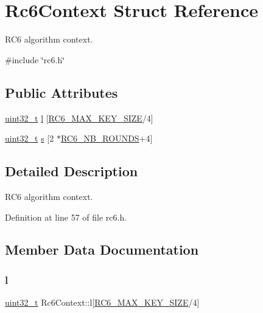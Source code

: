 \hypertarget{structRc6Context}{}\section{Rc6\+Context Struct Reference}
\label{structRc6Context}


R\+C6 algorithm context.  




{\ttfamily \#include \char`\"{}rc6.\+h\char`\"{}}

\subsection*{Public Attributes}
\begin{DoxyCompactItemize}
\item 
\hyperlink{stdint_8h_a435d1572bf3f880d55459d9805097f62}{uint32\+\_\+t} \hyperlink{structRc6Context_a57e222dc7a0b7dfe4c0df8f128199545}{l} \mbox{[}\hyperlink{rc6_8h_ae6868b69ce9bb58bb05dfc9f03567402}{R\+C6\+\_\+\+M\+A\+X\+\_\+\+K\+E\+Y\+\_\+\+S\+I\+ZE}/4\mbox{]}
\item 
\hyperlink{stdint_8h_a435d1572bf3f880d55459d9805097f62}{uint32\+\_\+t} \hyperlink{structRc6Context_a984b8519b232e9041568d2ccaef2f451}{s} \mbox{[}2 $\ast$\hyperlink{rc6_8h_a36bcca60e56650daa3b834e6d37b73bc}{R\+C6\+\_\+\+N\+B\+\_\+\+R\+O\+U\+N\+DS}+4\mbox{]}
\end{DoxyCompactItemize}


\subsection{Detailed Description}
R\+C6 algorithm context. 

Definition at line 57 of file rc6.\+h.



\subsection{Member Data Documentation}
\mbox{\label{structRc6Context_a57e222dc7a0b7dfe4c0df8f128199545}} 
\subsubsection{\texorpdfstring{l}{l}}
{\footnotesize\ttfamily \hyperlink{stdint_8h_a435d1572bf3f880d55459d9805097f62}{uint32\+\_\+t} Rc6\+Context\+::l\mbox{[}\hyperlink{rc6_8h_ae6868b69ce9bb58bb05dfc9f03567402}{R\+C6\+\_\+\+M\+A\+X\+\_\+\+K\+E\+Y\+\_\+\+S\+I\+ZE}/4\mbox{]}}



